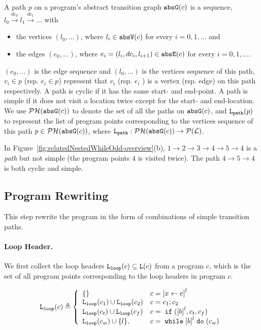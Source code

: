 \begin{defn}[Path]
 \label{def:abs_cfgpath} 
 A path $p$ on a program's abstract transition graph $\mathtt{abs}{\mathtt{G}}(c)$ is a sequence, $ l_0 \xrightarrow{dc_0} l_1 \xrightarrow{dc_1} \ldots $ with
 \begin{itemize}
 \item the vertices $(l_0, \ldots)$, where $l_i \in \mathtt{abs}{\mathtt{V}}(c)$ for every $i = 0, 1, \ldots$ and
 \item the edges $(e_0, \ldots)$, where $e_i = (l_{i}, dc_i, l_{i + 1}) \in \mathtt{abs}{\mathtt{E}}(c)$ for every $i = 0, 1, \ldots$.
 \end{itemize}
  $(e_0, \ldots)$ is the edge sequence and $(l_0, \ldots)$ is the vertices sequence
 of this path, $v_i \in p$ (rsp. $e_i \in p$) represent that $v_i$ (rsp. $e_i$ ) is a vertex (rsp. edge) on this path respectively.
 A path is cyclic if it has the same start- and end-point. A path is simple if it does not visit a location twice except for the start- and end-location. We use $\mathcal{PH}(\mathtt{abs}{\mathtt{G}}(c))$ to denote the set of all the paths on $\mathtt{abs}{\mathtt{G}}(c)$,
 and $\mathtt{L}_{\mathtt{path}}(p)$ to represent the list of program points corresponding to the vertices sequence of this path $p \in \mathcal{PH}(\mathtt{abs}{\mathtt{G}}(c))$,
 where $\mathtt{L}_{\mathtt{path}}: \mathcal{PH}(\mathtt{abs}{\mathtt{G}}(c)) \to \mathcal{P}{(\mathcal{L})}$.
 \end{defn}
 In Figure~\ref{fig:relatedNestedWhileOdd-overview}(b), $1 \to 2 \to 3 \to 4 \to 5 \to 4$ is a \emph{path} but not simple (the program points $4$ is visited twice). The path $4 \to 5 \to 4$ is both cyclic and simple.


\subsection{Program Rewriting}
This step rewrite the program in the form of combinations of simple transition paths.



\paragraph{Loop Header.}
We first collect the loop headers $\mathtt{L}_{\mathtt{loop}}(c) \subseteq \mathtt{L}(c)$ from a program $c$, which is the set of all program points corresponding to the loop headers in program $c$.
\begin{defn}
  \label{def:loopl}
  \[
  \loopl(c) \triangleq 
  \left\{
    \begin{array}{ll}
      \{\}  & {c} = \clabel{\assign x e}^{l} \\
      \loopl({c_1}) \cup \loopl({{c_2}})  & {c} = {c_1};{c_2} \\
      \loopl(c_t) \cup \loopl({{c_f}})   & {c} =\eif(\clabel{\bexpr}^{l}, c_t, c_f) \\
  \loopl(c_w) \cup \{l\}, &  {c}   = \ewhile \clabel{\bexpr}^{l} \edo (c_w)
  \end{array}
\right.
\]
  \end{defn}

